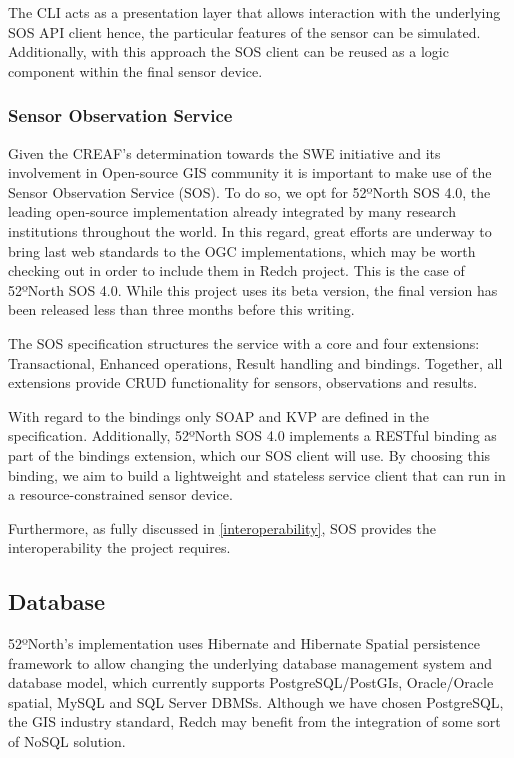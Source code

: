 The CLI acts as a presentation layer that allows interaction with the underlying SOS API client hence, the particular features of the sensor can be simulated. Additionally, with this approach the SOS client can be reused as a logic component within the final sensor device.

\subsubsection{Sensor Observation Service}

Given the CREAF's determination towards the SWE initiative and its involvement in Open-source GIS community it is important to make use of the Sensor Observation Service (SOS). To do so, we opt for 52ºNorth SOS 4.0, the leading open-source implementation already integrated by many research institutions throughout the world. In this regard, great efforts are underway to bring last web standards to the OGC implementations, which may be worth checking out in order to include them in Redch project. This is the case of 52ºNorth SOS 4.0. While this project uses its beta version, the final version has been released less than three months before this writing.

The SOS specification structures the service with a core and four extensions: Transactional, Enhanced operations, Result handling and bindings. Together, all extensions provide CRUD functionality for sensors, observations and results.

With regard to the bindings only SOAP and KVP are defined in the specification. Additionally, 52ºNorth SOS 4.0 implements a RESTful binding as part of the bindings extension, which our SOS client will use. By choosing this binding, we aim to build a lightweight and stateless service client that can run in a resource-constrained sensor device.

Furthermore, as fully discussed in \ref{interoperability}, SOS provides the interoperability the project requires.

\subsection{Database}

52ºNorth's implementation uses Hibernate and Hibernate Spatial persistence framework to allow changing the underlying database management system and database model, which currently supports PostgreSQL/PostGIs, Oracle/Oracle spatial, MySQL and SQL Server DBMSs. Although we have chosen PostgreSQL, the GIS industry standard, Redch may benefit from the integration of some sort of NoSQL solution.

